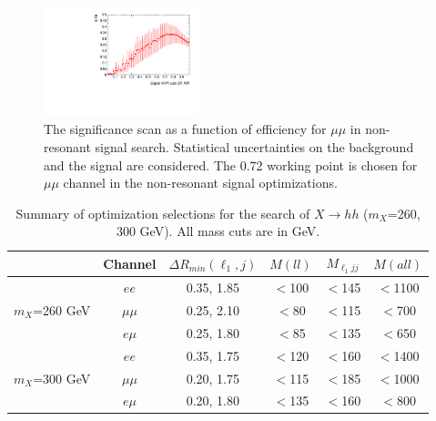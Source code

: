 \begin{figure}[h]
\begin{center}
\includegraphics[width = 0.4\textwidth]{fig/SigOpt/nonres/SOverRootB_mumu.pdf}
\caption{The significance scan as a function of efficiency for $\mu\mu$ in non-resonant signal search. Statistical uncertainties on the background and the signal are considered. The 0.72 working point is chosen for $\mu\mu$ channel in the non-resonant signal optimizations.}
\label{fig:nonres:SigOpt_mumu}
\end{center}
\end{figure}

\begin{table}[h]
\begin{center}
\begin{tabular}{c|c|c|c|c|c}
\hline
\hline
  &Channel &$\Delta R_{min}(\ell_{1}, j)$ &$M(ll)$  &$M_{\ell_{1}jj}$ &$M(all)$\\
\hline
\multirow{3}{2.0cm}{$m_X$=260 GeV} &$ee$  &0.35, 1.85
&$<$100
&$<$145
&$<$1100  \\
&$\mu\mu$
&0.25, 2.10
&$<$80
&$<$115
&$<$700 \\
&$e\mu$
&0.25, 1.80
&$<$85
&$<$135
&$<$650\\
\hline
\multirow{3}{2.0cm}{$m_X$=300 GeV} &$ee$
&0.35, 1.75
&$<$120
&$<$160
&$<$1400 \\
&$\mu\mu$
&0.20, 1.75
&$<$115
&$<$185
&$<$1000 \\
&$e\mu$
&0.20, 1.80
&$<$135
&$<$160
&$<$800 \\
\hline
\hline
\end{tabular}
\end{center}
\caption{Summary of optimization selections for the search of $X \rightarrow hh$ ($m_{X}$=260, 300 GeV). All mass cuts are in GeV.}
\label{optimization_cuts_lowmass}
\end{table}


